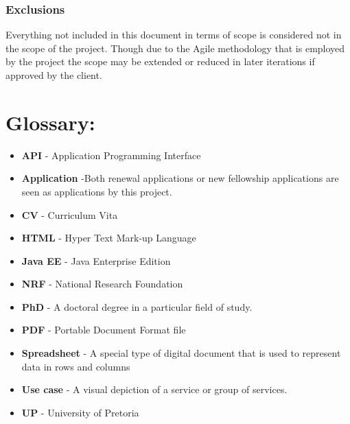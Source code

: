 \documentclass[12pt]{article}
\begin{document}
\subsubsection{Exclusions}
\vspace{0.2in}
Everything not included in this document in terms of scope is considered not in the scope of the project. Though due to the Agile methodology that is employed by the project the scope may be extended or reduced in later iterations if approved by the client.
\vspace{0.2in}

\newpage
\section{Glossary:} %
\vspace{0.2in}

\begin{itemize}

\item \textbf{API} - Application Programming Interface
\item \textbf{Application} -Both renewal applications or new fellowship applications are seen as applications by this project.
\item \textbf{CV} - Curriculum Vita
\item \textbf{HTML} - Hyper Text Mark-up Language
\item \textbf{Java EE} - Java Enterprise Edition
\item \textbf{NRF} - National Research Foundation
\item \textbf{PhD} - A doctoral degree in a particular field of study.
\item \textbf{PDF} - Portable Document Format file
\item \textbf{Spreadsheet} - A special type of digital document that is used to represent data in rows and columns
\item \textbf{Use case} - A visual depiction of a service or group of services.
\item \textbf{UP} - University of Pretoria
 


\end{itemize}	
\end{document}
